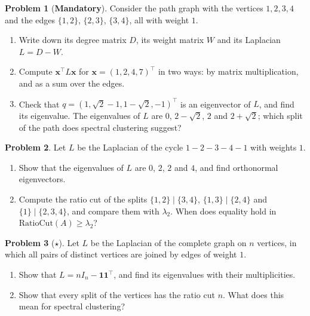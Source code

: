 \documentclass[11pt]{article}
\theoremstyle{definition}
\newtheorem{problem}{Problem}[section]
\newcommand{\mandatory}{\textcolor{red!70!black}{\textbf{Mandatory}}}
\begin{document}
\begin{problem}[\mandatory]\label{pr:laplacian-path}
    Consider the path graph with the vertices $1, 2, 3, 4$ and the edges $\{1, 2\}$, $\{2, 3\}$, $\{3, 4\}$, all with weight $1$.
    \begin{enumerate}[label=(\alph*)]
        \item Write down its degree matrix $D$, its weight matrix $W$ and its Laplacian $L = D - W$.
        \item Compute $\mathbf{x}^\top L\mathbf{x}$ for $\mathbf{x} = (1, 2, 4, 7)^\top$ in two ways: by matrix multiplication, and as a sum over the edges.
        \item Check that $q = (1, \sqrt{2} - 1, 1 - \sqrt{2}, -1)^\top$ is an eigenvector of $L$, and find its eigenvalue. The eigenvalues of $L$ are $0$, $2 - \sqrt{2}$, $2$ and $2 + \sqrt{2}$; which split of the path does spectral clustering suggest?
    \end{enumerate}
\end{problem}

\begin{problem}\label{pr:laplacian-cycle}
    Let $L$ be the Laplacian of the cycle $1 - 2 - 3 - 4 - 1$ with weights $1$.
    \begin{enumerate}[label=(\alph*)]
        \item Show that the eigenvalues of $L$ are $0$, $2$, $2$ and $4$, and find orthonormal eigenvectors.
        \item Compute the ratio cut of the splits $\{1, 2\} \mid \{3, 4\}$, $\{1, 3\} \mid \{2, 4\}$ and $\{1\} \mid \{2, 3, 4\}$, and compare them with $\lambda_2$. When does equality hold in $\mathrm{RatioCut}(A) \geq \lambda_2$?
    \end{enumerate}
\end{problem}

\begin{problem}[$\star$]\label{pr:laplacian-complete}
    Let $L$ be the Laplacian of the complete graph on $n$ vertices, in which all pairs of distinct vertices are joined by edges of weight $1$.
    \begin{enumerate}[label=(\alph*)]
        \item Show that $L = nI_n - \mathbf{1}\mathbf{1}^\top$, and find its eigenvalues with their multiplicities.
        \item Show that every split of the vertices has the ratio cut $n$. What does this mean for spectral clustering?
    \end{enumerate}
\end{problem}
\end{document}
